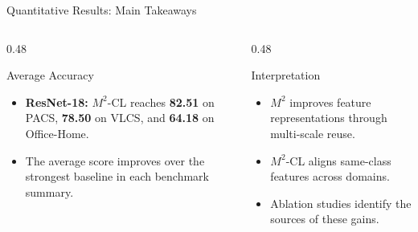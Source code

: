 \documentclass[t, aspectratio=169]{beamer} %
\begin{document}
	\begin{frame}{Quantitative Results: Main Takeaways}
		\begin{columns}[T]
			\begin{column}{0.48\textwidth}
				\begin{block}{Average Accuracy}
					\begin{itemize}
						\item \textbf{ResNet-18:} $M^2$-CL reaches \textbf{82.51} on PACS, \textbf{78.50} on VLCS, and \textbf{64.18} on Office-Home.
						\item The average score improves over the strongest baseline in each benchmark summary.
					\end{itemize}
				\end{block}
			\end{column}
			\begin{column}{0.48\textwidth}
				\begin{alertblock}{Interpretation}
	\begin{itemize}
		\item $M^2$ improves feature representations through multi-scale reuse.
		\item $M^2$-CL aligns same-class features across domains.
		\item Ablation studies identify the sources of these gains.
	\end{itemize}
\end{alertblock}
			\end{column}
		\end{columns}
	\end{frame}
\end{document}
